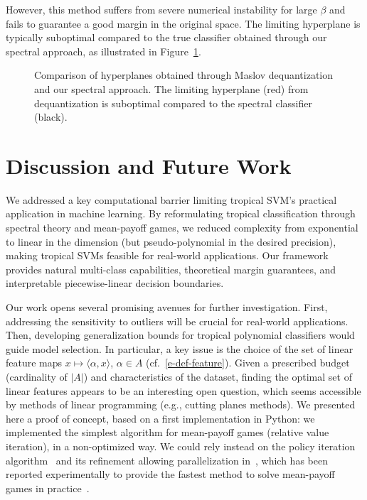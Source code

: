 \documentclass{article}
\def\<#1,#2>{\langle #1,#2\rangle}
\begin{document}
However, this method suffers from severe numerical instability for large $\beta$ and fails to guarantee a good margin in the original space. The limiting hyperplane is typically suboptimal compared to the true classifier obtained through our spectral approach, as illustrated in Figure~\ref{fig:maslov_dequantization}.

\begin{figure}[h]
    \centering
    \resizebox{0.5\textwidth}{!}{\clipbox{0.15\width{} 0.15\height{} 0.15\width{} 0.15\height{}}{}}
    \caption{Comparison of hyperplanes obtained through Maslov dequantization and our spectral approach. The limiting hyperplane (red) from dequantization is suboptimal compared to the spectral classifier (black).}
    \label{fig:maslov_dequantization}
\end{figure}

\section{Discussion and Future Work}\label{sec:discussion}

We addressed a key computational barrier limiting tropical SVM's practical application in machine learning. By reformulating tropical classification through spectral theory and mean-payoff games, we reduced complexity from exponential to linear in the dimension (but pseudo-polynomial in the desired precision),
making tropical SVMs feasible for real-world applications.
Our framework provides natural multi-class capabilities, theoretical margin guarantees, and interpretable piecewise-linear decision boundaries.

Our work opens several promising avenues for further investigation. First, addressing the sensitivity to outliers will be crucial for real-world applications. Then, developing generalization bounds for tropical polynomial classifiers would guide model selection. In particular, a key issue is the choice of the set of linear feature maps $x\mapsto \<\alpha,x>$, $\alpha\in A$ (cf.\ \eqref{e-def-feature}). Given a prescribed budget (cardinality of $|A|$) and characteristics
of the dataset, finding the optimal set of linear features
appears to be an interesting open question, which seems accessible
by methods of linear programming (e.g., cutting planes methods).
We presented here a proof of concept, based on a first implementation in Python: we implemented the simplest algorithm for mean-payoff games
(relative value iteration), in a non-optimized way. We could rely instead on the policy iteration algorithm~\cite{DG-06} and its refinement allowing parallelization in~\cite{chaloupkathesis}, which has been reported experimentally to provide the fastest method to solve mean-payoff
games in practice~\cite{chaloupka}.
\end{document}
